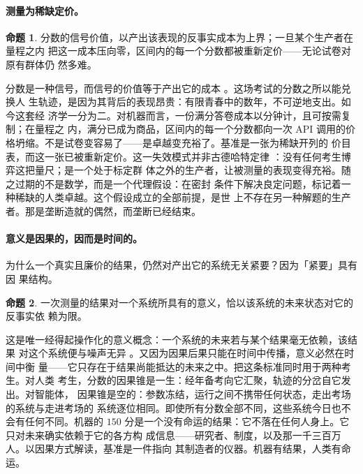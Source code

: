 \documentclass[11pt,UTF8]{ctexart}
\theoremstyle{definition}
\newtheorem{proposition}{命题}
\begin{document}
\paragraph{测量为稀缺定价。}
\begin{proposition}\label{prop:repricing}
分数的信号价值，以产出该表现的反事实成本为上界；一旦某个生产者在量程之内
把这一成本压向零，区间内的每一个分数都被重新定价——无论试卷对原有群体仍
然多难。
\end{proposition}
分数是一种信号，而信号的价值等于产出它的成本
\citep{spence1973job}。这场考试的分数之所以能兑换人
生轨迹，是因为其背后的表现昂贵：有限青春中的数年，不可逆地支出。如今这套经
济学一分为二。对机器而言，一份满分答卷成本以分钟计，且可按需复制；在量程之
内，满分已成为商品，区间内的每一个分数都向一次 API
调用的价格坍缩。不是试卷变容易了——是卓越变充裕了。基准是一张为稀缺开列的
价目表，而这一张已被重新定价。这一失效模式并非古德哈特定律
\citep{strathern1997improving}：没有任何考生博弈这把量尺；是一个处于标定群
体之外的生产者，让被测量的表现变得充裕。随之过期的不是数学，而是一个代理假设：在密封
条件下解决良定问题，标记着一种稀缺的人类卓越。这个假设成立的全部前提，是世
上不存在另一种解题的生产者。那是垄断造就的偶然，而垄断已经结束。

\paragraph{意义是因果的，因而是时间的。}
为什么一个真实且廉价的结果，仍然对产出它的系统无关紧要？因为「紧要」具有因
果结构。
\begin{proposition}\label{prop:meaning}
一次测量的结果对一个系统所具有的意义，恰以该系统的未来状态对它的反事实依
赖为限。
\end{proposition}
这是唯一经得起操作化的意义概念：一个系统的未来若与某个结果毫无依赖，该结果
对这个系统便与噪声无异
\citep[参见][]{dretske1981knowledge,pearl2009causality}。又因为因果后果只能在时间中传播，意义必然在时间中衡
量——它只存在于结果尚能抵达的未来之中。把这条标准同时用于两种考生。对人类
考生，分数的因果锥是一生：经年备考向它汇聚，轨迹的分岔自它发出。对智能体，
因果锥是空的：参数冻结，运行之间不携带任何状态，走出考场的系统与走进考场的
系统逐位相同。即使所有分数全部不同，这些系统今日也不会有任何不同。机器的
$150$
分是一个没有命运的结果：它不落在任何人身上。它只对未来确实依赖于它的各方构
成信息——研究者、制度，以及那一千三百万人。以因果方式解读，基准是一件指向
其制造者的仪器。机器有结果，人类有命运。
\end{document}
